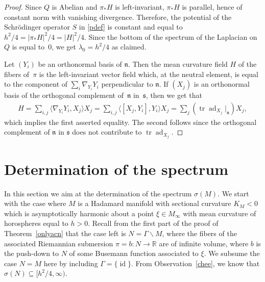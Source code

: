\documentclass[pdftex]{sigma}
\numberwithin{equation}{section}
\DeclareMathOperator{\ad}{ad}
\DeclareMathOperator{\id}{id}
\DeclareMathOperator{\tr}{tr}
\def\R{\mathbb R}
\begin{document}
\begin{proof}
Since $Q$ is Abelian and $\pi_*H$ is left-invariant,
$\pi_*H$ is parallel, hence of constant norm with vanishing divergence.
Therefore, the potential of the Schr\"odinger operator $S$ in \eqref{pdef} is constant
and equal to $h^2/4=|\pi_*H|^2/4=|H|^2/4$.
Since the bottom of the spectrum of the Laplacian on~$Q$ is equal to~$0$,
we get $\lambda_0=h^2/4$ as claimed.

Let $(Y_i)$ be an orthonormal basis of $\mathfrak n$.
Then the mean curvature field $H$ of the fibers of~$\pi$ is the left-invariant vector field
which, at the neutral element, is equal to the component of $\sum_i\nabla_{Y_i}Y_i$
perpendicular to $\mathfrak n$.
If $(X_j)$ is an orthonormal basis of the orthogonal complement of~$\mathfrak n$ in~$\mathfrak s$,
then we get that
\begin{align*}%
	H = \sum_{i,j}\langle\nabla_{Y_i}Y_i,X_j\rangle X_j
	= \sum_{i,j}\langle[X_j,Y_i],Y_i\rangle X_j
	= \sum_j(\tr\ad_{X_j}|_{\mathfrak n})X_j,
\end{align*}
which implies the first asserted equality.
The second follows since the orthogonal complement of $\mathfrak n$ in $\mathfrak s$
does not contribute to $\tr\ad_{X_j}$.
\end{proof}

\section{Determination of the spectrum}\label{secsig}

In this section we aim at the determination of the spectrum $\sigma(M)$.
We start with the case where $M$ is a Hadamard manifold with sectional curvature $K_M<0$
which is asymptotically harmonic about a point $\xi\in M_\infty$
with mean curvature of horospheres equal to $h>0$.
Recall from the first part of the proof of Theorem~\ref{onlyacn}
that the case left is $N=\Gamma\backslash M$,
where the fibers of the associated Riemannian submersion $\pi=b\colon N\to\R$ are of infinite volume,
where $b$ is the push-down to $N$ of some Busemann function associated to $\xi$.
We subsume the case $N=M$ here by including $\Gamma=\{\id\}$.
From Observation~\ref{chee}, we know that $\sigma(N)\subseteq\bigl[h^2/4,\infty\bigr)$.
\end{document}
